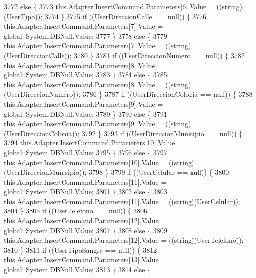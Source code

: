 \begin{DoxyCode}
3772             \textcolor{keywordflow}{else} \{
3773                 this.Adapter.InsertCommand.Parameters[6].Value = ((string)(UserTipo));
3774             \}
3775             \textcolor{keywordflow}{if} ((UserDireccionCalle == null)) \{
3776                 this.Adapter.InsertCommand.Parameters[7].Value = global::System.DBNull.Value;
3777             \}
3778             \textcolor{keywordflow}{else} \{
3779                 this.Adapter.InsertCommand.Parameters[7].Value = ((string)(UserDireccionCalle));
3780             \}
3781             \textcolor{keywordflow}{if} ((UserDireccionNumero == null)) \{
3782                 this.Adapter.InsertCommand.Parameters[8].Value = global::System.DBNull.Value;
3783             \}
3784             \textcolor{keywordflow}{else} \{
3785                 this.Adapter.InsertCommand.Parameters[8].Value = ((string)(UserDireccionNumero));
3786             \}
3787             \textcolor{keywordflow}{if} ((UserDireccionColonia == null)) \{
3788                 this.Adapter.InsertCommand.Parameters[9].Value = global::System.DBNull.Value;
3789             \}
3790             \textcolor{keywordflow}{else} \{
3791                 this.Adapter.InsertCommand.Parameters[9].Value = ((string)(UserDireccionColonia));
3792             \}
3793             \textcolor{keywordflow}{if} ((UserDireccionMunicipio == null)) \{
3794                 this.Adapter.InsertCommand.Parameters[10].Value = global::System.DBNull.Value;
3795             \}
3796             \textcolor{keywordflow}{else} \{
3797                 this.Adapter.InsertCommand.Parameters[10].Value = ((string)(UserDireccionMunicipio));
3798             \}
3799             \textcolor{keywordflow}{if} ((UserCelular == null)) \{
3800                 this.Adapter.InsertCommand.Parameters[11].Value = global::System.DBNull.Value;
3801             \}
3802             \textcolor{keywordflow}{else} \{
3803                 this.Adapter.InsertCommand.Parameters[11].Value = ((string)(UserCelular));
3804             \}
3805             \textcolor{keywordflow}{if} ((UserTelefono == null)) \{
3806                 this.Adapter.InsertCommand.Parameters[12].Value = global::System.DBNull.Value;
3807             \}
3808             \textcolor{keywordflow}{else} \{
3809                 this.Adapter.InsertCommand.Parameters[12].Value = ((string)(UserTelefono));
3810             \}
3811             \textcolor{keywordflow}{if} ((UserTipoSangre == null)) \{
3812                 this.Adapter.InsertCommand.Parameters[13].Value = global::System.DBNull.Value;
3813             \}
3814             \textcolor{keywordflow}{else} \{

\end{DoxyCode}
